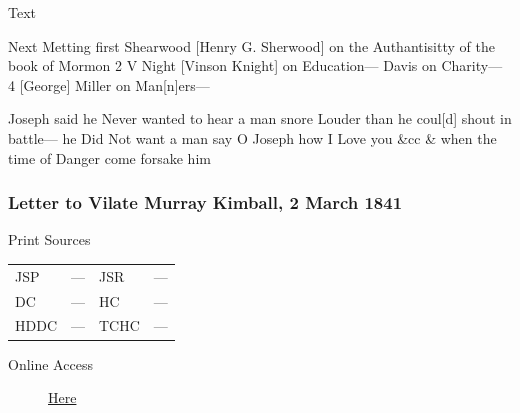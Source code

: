 				
				\begin{description}
					\item[Text]
				\end{description}
				
					Next Metting first Shearwood [Henry G. Sherwood] on the Authantisitty of the book of Mormon 2 V Night [Vinson Knight] on Education---  Davis on Charity--- 4 [George] Miller on Man[n]ers---
					
					Joseph said he Never wanted to hear a man snore Louder than he coul[d] shout in battle--- he Did Not want a man say O Joseph how I Love you \&cc \& when the time of Danger come forsake him
					
		\subsubsection{Letter to Vilate Murray Kimball, 2 March 1841}
			\label{EMS-1841-JS-2-MAR-1841}
			
			\begin{description}
				\item[Print Sources]
			\end{description}

			\begin{tabular}{p{0.5in}p{1in}p{0.5in}p{1in}}
				JSP	 	& ---		& JSR 		& --- \\
				DC	 	& ---		& HC 		& --- \\
				HDDC 	& ---		& TCHC 		& --- \\
			\end{tabular}
			
			\begin{description}
				\item[Online Access] \href{https://www.josephsmithpapers.org/paper-summary/letter-to-vilate-murray-kimball-2march-1841/1}{Here}
			\end{description}
			
